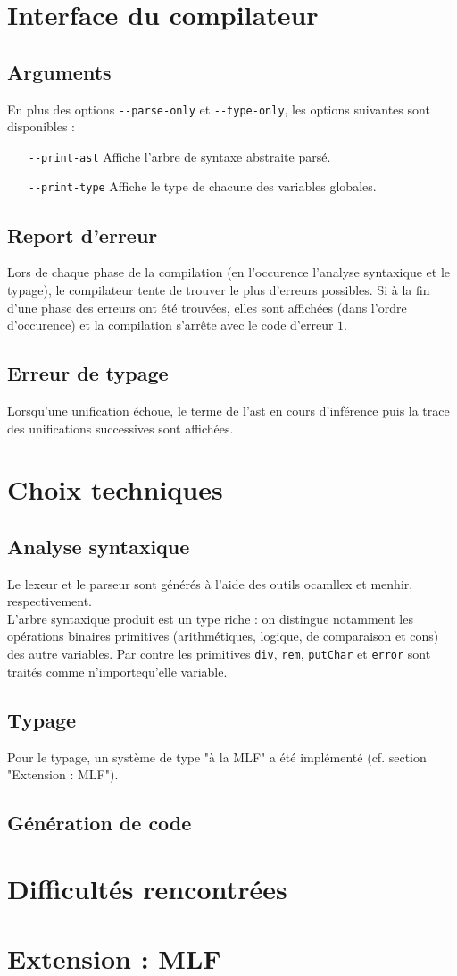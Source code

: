 \documentclass[a4paper]{article}
\begin{document}
\section{Interface du compilateur}

\subsection{Arguments}
En plus des options \texttt{-{}-parse-only} et \texttt{-{}-type-only}, les options suivantes sont disponibles :
\begin{itemize}
\item[\texttt{-{}-print-ast}] Affiche l'arbre de syntaxe abstraite parsé.
\item[\texttt{-{}-print-type}] Affiche le type de chacune des variables globales.
\end{itemize}

\subsection{Report d'erreur}
Lors de chaque phase de la compilation (en l'occurence l'analyse syntaxique et le typage), le compilateur tente de trouver le plus d'erreurs possibles. Si à la fin d'une phase des erreurs ont été trouvées, elles sont affichées (dans l'ordre d'occurence) et la compilation s'arrête avec le code d'erreur $1$.

\subsection{Erreur de typage}
Lorsqu'une unification échoue, le terme de l'ast en cours d'inférence puis la trace des unifications successives sont affichées.

\section{Choix techniques}
\subsection{Analyse syntaxique}
Le lexeur et le parseur sont générés à l'aide des outils ocamllex et menhir, respectivement. \\
L'arbre syntaxique produit est un type riche : on distingue notamment les opérations binaires primitives (arithmétiques, logique, de comparaison et cons) des autre variables. Par contre les primitives \texttt{div}, \texttt{rem}, \texttt{putChar} et \texttt{error} sont traités comme n'importequ'elle variable.

\subsection{Typage}
Pour le typage, un système de type "à la MLF" a été implémenté (cf. section "Extension : MLF").

\subsection{Génération de code}


\section{Difficultés rencontrées}

\section{Extension : MLF}
\end{document}
